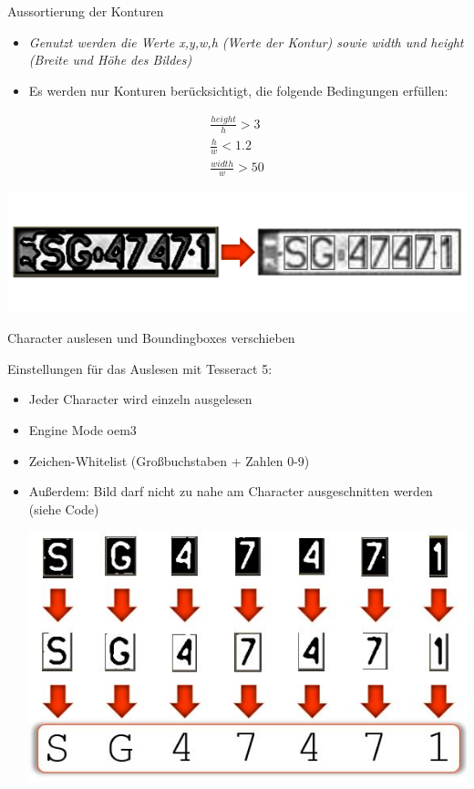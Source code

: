 \begin{frame}{Aussortierung der Konturen}
\begin{itemize}
\item {\textit{\scriptsize Genutzt werden die Werte x,y,w,h (Werte der Kontur) sowie width und height (Breite und Höhe des Bildes)}}
\item {\scriptsize Es werden nur Konturen berücksichtigt, die folgende Bedingungen erf\"ullen:}
\end{itemize}
\begin{eqnarray}
    \frac{height}{h} > 3
    \\
    \frac{h}{w} < 1.2
    \\
    \frac{width}{w} > 50
\end{eqnarray}
    \begin{center}
        \includegraphics[width=\textwidth]{img/contours}
    \end{center}
\end{frame}

\begin{frame}{Character auslesen und Boundingboxes verschieben}

{\footnotesize Einstellungen für das Auslesen mit Tesseract 5:}
\begin{itemize}
\item {\scriptsize Jeder Character wird einzeln ausgelesen }
\item {\scriptsize Engine Mode oem3}
\item {\scriptsize Zeichen-Whitelist (Großbuchstaben + Zahlen 0-9)}
\item {\scriptsize Außerdem: Bild darf nicht zu nahe am Character ausgeschnitten werden (siehe Code)}

\begin{center}
    \includegraphics[width=\textwidth,keepaspectratio]{img/char_preprocessing.jpg}
\end{center}

\end{itemize}
\end{frame}


